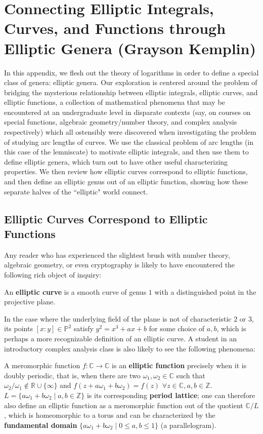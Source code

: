 
\section{Connecting Elliptic Integrals, Curves, and Functions through Elliptic Genera (Grayson Kemplin)}

In this appendix, we flesh out the theory of logarithms in order to define a special class of genera: elliptic genera. Our exploration is centered around the problem of bridging the mysterious relationship between elliptic integrals, elliptic curves, and elliptic functions, a collection of mathematical phenomena that may be encountered at an undergraduate level in disparate contexts (say, on courses on special functions, algebraic geometry/number theory, and complex analysis respectively) which all ostensibly were discovered when investigating the problem of studying arc lengths of curves. We use the classical problem of arc lengths (in this case of the lemniscate) to motivate elliptic integrals, and then use them to define elliptic genera, which turn out to have other useful characterizing properties. We then review how elliptic curves correspond to elliptic functions, and then define an elliptic genus out of an elliptic function, showing how these separate halves of the ``elliptic" world connect.

\subsection{Elliptic Curves Correspond to Elliptic Functions}

Any reader who has experienced the slightest brush with number theory, algebraic geometry, or even cryptography is likely to have encountered the following rich object of inquiry:

\begin{definition}
    An \textbf{elliptic curve} is a smooth curve of genus $1$ with a distinguished point in the projective plane. 
\end{definition}
In the case where the underlying field of the plane is not of characteristic $2$ or $3$,  its points $[x: y] \in \mathbb{P}^2$ satisfy $y^2 = x^3 + ax +b$ for some choice of $a, b$, which is perhaps a more recognizable definition of an elliptic curve. A student in an introductory complex analysis class is also likely to see the following phenomena:

\begin{definition}
A meromorphic function  $f: \mathbb{C} \to \mathbb{C}$ is an \textbf{elliptic function} precisely when it is doubly periodic, that is, when there are two $\omega_1, \omega_2 \in \mathbb{C}$ such that $\omega_2/\omega_1 \notin \mathbb{R} \cup \{\infty \}$ and $f(z + a \omega_1 + b \omega_2) = f(z)$ $\forall z \in \mathbb{C}, a, b \in \mathbb{Z}$. $L = \{a \omega_1 + b \omega_2 \mid a, b \in \mathbb{Z} \}$ is its corresponding \textbf{period lattice}; one can therefore also define an elliptic function as a meromorphic function out of the quotient $\mathbb{C} / L$, which is homeomorphic to a torus and can be characterized by the \textbf{fundamental domain} $\{ a \omega_1 + b \omega_2 \mid 0 \leq a, b \leq 1\}$ (a parallelogram). 
\end{definition}


